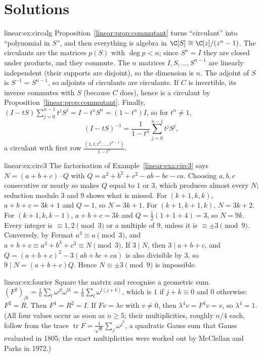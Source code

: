 \section{Solutions}

\begin{solution}{linear:ex:circalg}
\idea Proposition~\ref{linear:prop:commutant} turns ``circulant'' into ``polynomial in $S$'', and then everything is algebra in
$\C[S]\cong\C[z]/(z^n-1)$.
\writeup The circulants are the matrices $p(S)$ with $\deg p<n$; since $S^n=I$ they are closed under products, and they commute.
The $n$ matrices $I,S,\dots,S^{n-1}$ are linearly independent (their supports are disjoint), so the dimension is $n$. The adjoint of
$S$ is $S^{-1}=S^{n-1}$, so adjoints of circulants are circulants. If $C$ is invertible, its inverse commutes with $S$ (because $C$
does), hence is a circulant by Proposition~\ref{linear:prop:commutant}. Finally, $(I-tS)\sum_{j=0}^{n-1}t^jS^j=I-t^nS^n=(1-t^n)I$, so for
$t^n\ne1$,
\[
(I-tS)^{-1}=\frac1{1-t^n}\sum_{j=0}^{n-1}t^jS^j,
\]
a circulant with first row $\frac{(1,t,t^2,\dots,t^{n-1})}{1-t^n}$.
\end{solution}

\begin{solution}{linear:ex:circ3}
\idea The factorisation of Example~\ref{linear:exa:circ3} says $N=(a+b+c)\cdot Q$ with $Q=a^2+b^2+c^2-ab-bc-ca$. Choosing $a,b,c$
consecutive or nearly so makes $Q$ equal to $1$ or $3$, which produces almost every $N$; reduction modulo $3$ and $9$ shows what is
missed.
\writeup For $(k+1,k,k)$, $a+b+c=3k+1$ and $Q=1$, so $N=3k+1$. For $(k+1,k+1,k)$, $N=3k+2$. For $(k+1,k,k-1)$, $a+b+c=3k$ and $Q=
\frac12(1+1+4)=3$, so $N=9k$. Every integer is $\equiv1,2\pmod3$ or a multiple of $9$, unless it is $\equiv\pm3\pmod9$. Conversely, by
Fermat $a^3\equiv a\pmod3$, and $a+b+c\equiv a^3+b^3+c^3\equiv N\pmod3$. If $3\mid N$, then $3\mid a+b+c$, and
$Q=(a+b+c)^2-3(ab+bc+ca)$ is also divisible by $3$, so $9\mid N=(a+b+c)Q$. Hence $N\equiv\pm3\pmod9$ is impossible.
\end{solution}

\begin{solution}{linear:ex:fourier}
\idea Square the matrix and recognise a geometric sum.
\writeup $(F^2)_{jk}=\frac1n\sum_l\omega^{jl}\omega^{lk}=\frac1n\sum_l\omega^{l(j+k)}$, which is $1$ if $j+k\equiv0$ and $0$ otherwise:
$F^2=R$. Then $F^4=R^2=I$. If $Fv=\lambda v$ with $v\ne0$, then $\lambda^4v=F^4v=v$, so $\lambda^4=1$. (All four values occur as soon as
$n\ge5$; their multiplicities, roughly $n/4$ each, follow from the trace $\operatorname{tr}F=\frac1{\sqrt n}\sum_j\omega^{j^2}$,
a quadratic Gauss sum that Gauss evaluated in 1805; the exact multiplicities were worked out by McClellan and Parks in 1972.)
\end{solution}

